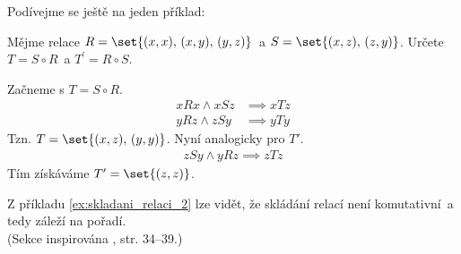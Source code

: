 Podívejme se ještě na jeden příklad:
\begin{example}\label{ex:skladani_relaci_2}
    Mějme relace $R=\set{(x,x),\,(x,y),\,(y,z)}$~a $S=\set{(x,z),\,(z,y)}$. Určete $T=S\circ R$~a $T^\prime=R\circ S$.
\end{example}
\begin{solution}
    Začneme s $T=S\circ R$.
    \begin{align*}
        xRx \land xSz &\implies xTz\\
        yRz \land zSy &\implies yTy
    \end{align*}
    Tzn. $T=\set{(x,z),\,(y,y)}$. Nyní analogicky pro $T\prime$.
    \begin{align*}
        zSy \land yRz \implies zTz
    \end{align*}
    Tím získáváme $T^\prime=\set{(z,z)}$.
\end{solution}
Z příkladu \ref{ex:skladani_relaci_2} lze vidět, že skládání relací není komutativní~a tedy záleží na pořadí.\\
(Sekce inspirována \cite{MatousekNesetril2009}, str. 34--39.)